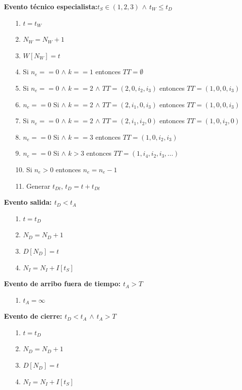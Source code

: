 \documentclass[12pt]{article}
\begin{document}
\noindent \textbf{Evento t\'ecnico especialista:$t_S \in (1,2,3)$ $\wedge$ $t_W \leq t_D$}
\begin{itemize}
        \item[1.] $t = t_W$
        \item[2.] $N_W = N_W + 1$
        \item[3.] $W[N_W] = t$
        
        \item[4.] Si $n_e == 0$ $\wedge$ $k == 1$ entonces $TT = \emptyset$
        
        \item[5.] Si $n_e == 0$ $\wedge$ $k == 2$ $\wedge$ $TT = (2, 0, i_2, i_3)$ entonces $TT = (1, 0, 0, i_3)$
        \item[6.] $n_e == 0$ Si $\wedge$ $k == 2$ $\wedge$ $TT = (2, i_1, 0, i_3)$ entonces $TT = (1, 0, 0, i_3)$
        \item[7.] Si $n_e == 0$ $\wedge$ $k == 2$ $\wedge$ $TT = (2, i_1, i_2, 0)$ entonces $TT = (1, 0, i_2, 0)$
        
        \item[8.] $n_e == 0$ Si $\wedge$ $k == 3$ entonces $TT = (1, 0, i_2, i_3)$      
        \item[9.] $n_e == 0$ Si $\wedge$ $k > 3$ entonces $TT = (1, i_4, i_2, i_3,...)$
        \item[10.] Si $n_e > 0$ entonces $n_e = n_e - 1$
        \item[11.] Generar $t_{Dt}$, $t_D = t + t_{Dt}$
\end{itemize}

\noindent \textbf{Evento salida: $t_D < t_A$}
\begin{itemize}
        \item[1.] $t = t_D$
        \item[2.] $N_D = N_D + 1$
        \item[3.] $D[N_D] = t$
        \item[4.] $N_I = N_I + I[t_S] $
\end{itemize}
\noindent \textbf{Evento de arribo fuera de tiempo: $t_A > T$}
\begin{itemize}
        \item[1.] $t_A = \infty$
\end{itemize}

\noindent \textbf{Evento de cierre: $t_D < t_A$ $\wedge$ $t_A > T$}
\begin{itemize}
        \item[1.] $t = t_D$
        \item[2.] $N_D = N_D + 1$
        \item[3.] $D[N_D] = t$
        \item[4.] $N_I = N_I + I[t_S] $
\end{itemize}
\end{document}
